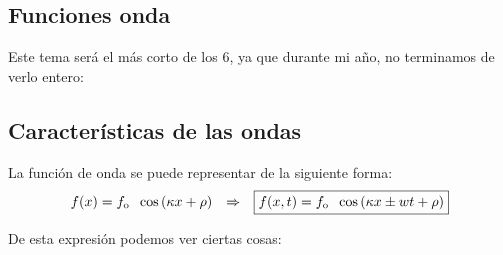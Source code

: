 \subsection{Funciones onda}
\noindent Este tema será el más corto de los 6, ya que durante mi año, no terminamos de verlo entero:
\subsection{Características de las ondas}
\noindent La función de onda se puede representar de la siguiente forma:
\[
        f(x) = f_{\textnormal{o}}\hspace{2mm} \cos{(\kappa x + \rho)} \hspace{2.5mm}\Rightarrow  \hspace{2.5mm}\boxed{f(x,t) = f_{\textnormal{o}}\hspace{2mm}\cos{(\kappa x \pm  wt+\rho)}}
\]
\begin{adjustwidth}{0em}{-8em}
\end{adjustwidth}
\noindent \hspace{-5em} De esta expresión podemos ver ciertas cosas:
